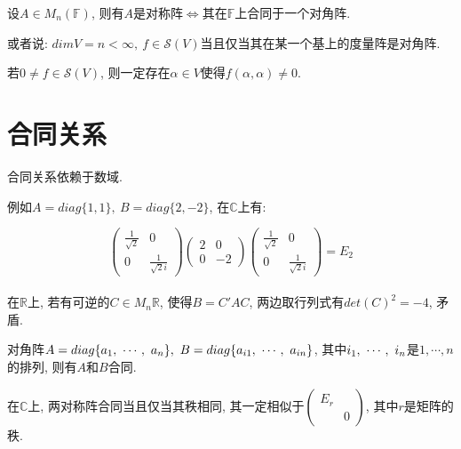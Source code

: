 \begin{theorem}[对称阵基本定理]
    设$A\in M_n(\mathbb{F})$, 则有$A$是对称阵$\Longleftrightarrow$其在$\mathbb{F}$上合同于一个对角阵.\par
    或者说: $dimV=n<\infty,\ f\in \mathscr{S}(V)$当且仅当其在某一个基上的度量阵是对角阵.
\end{theorem}

\begin{lemma}
    若$0\ne f\in \mathscr{S}(V)$, 则一定存在$\alpha \in V$使得$f(\alpha,\alpha)\ne 0$.
\end{lemma}

\section{ 合同关系 }

\begin{example}
    合同关系依赖于数域.\par
    例如$A=diag\{1,1\},\ B=diag\{2,-2\}$, 在$\mathbb{C}$上有:\par
    \[\begin{pmatrix}
        \frac{1}{\sqrt{2}} & 0\\
        0 & \frac{1}{\sqrt{2}i}
    \end{pmatrix}\begin{pmatrix}
        2 & 0\\
        0 & -2
    \end{pmatrix}\begin{pmatrix}
        \frac{1}{\sqrt{2}} & 0\\
        0 & \frac{1}{\sqrt{2}i}
    \end{pmatrix}=E_2\]\\
    在$\mathbb{R}$上, 若有可逆的$C\in M_n{\mathbb{R}}$, 使得$B=C'AC$, 两边取行列式有$det(C)^2=-4$, 矛盾.
\end{example}

\begin{lemma}
    对角阵$A=diag\{\vectorset{a}{n}\},\ B=diag\{\vectorsubset{a}{i}{n}\}$, 其中${i}{_1},\ \cdots,\ {i}{_{n}}$是$1,\cdots,n$的排列, 则有$A$和$B$合同.
\end{lemma}

\begin{inference}
    在$\mathbb{C}$上, 两对称阵合同当且仅当其秩相同, 其一定相似于$\begin{pmatrix}
        E_r &\\
         & 0
    \end{pmatrix}$, 其中$r$是矩阵的秩.
\end{inference}

